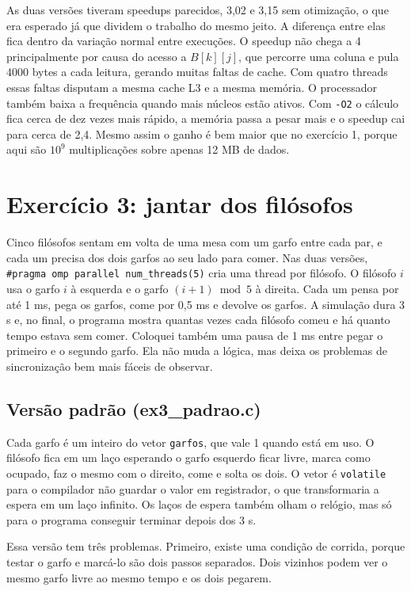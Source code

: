 \documentclass[11pt,a4paper]{article}
\begin{document}
As duas versões tiveram speedups parecidos, 3,02 e 3,15 sem otimização, o que era esperado já que dividem o trabalho do mesmo jeito. A diferença entre elas fica dentro da variação normal entre execuções. O speedup não chega a 4 principalmente por causa do acesso a $B[k][j]$, que percorre uma coluna e pula 4000 bytes a cada leitura, gerando muitas faltas de cache. Com quatro threads essas faltas disputam a mesma cache L3 e a mesma memória. O processador também baixa a frequência quando mais núcleos estão ativos. Com \texttt{-O2} o cálculo fica cerca de dez vezes mais rápido, a memória passa a pesar mais e o speedup cai para cerca de 2,4. Mesmo assim o ganho é bem maior que no exercício 1, porque aqui são $10^9$ multiplicações sobre apenas 12 MB de dados.

\section{Exercício 3: jantar dos filósofos}

Cinco filósofos sentam em volta de uma mesa com um garfo entre cada par, e cada um precisa dos dois garfos ao seu lado para comer. Nas duas versões, \texttt{\#pragma omp parallel num\_threads(5)} cria uma thread por filósofo. O filósofo $i$ usa o garfo $i$ à esquerda e o garfo $(i+1) \bmod 5$ à direita. Cada um pensa por até 1 ms, pega os garfos, come por 0,5 ms e devolve os garfos. A simulação dura 3 s e, no final, o programa mostra quantas vezes cada filósofo comeu e há quanto tempo estava sem comer. Coloquei também uma pausa de 1 ms entre pegar o primeiro e o segundo garfo. Ela não muda a lógica, mas deixa os problemas de sincronização bem mais fáceis de observar.

\subsection{Versão padrão (ex3\_padrao.c)}

Cada garfo é um inteiro do vetor \texttt{garfos}, que vale 1 quando está em uso. O filósofo fica em um laço esperando o garfo esquerdo ficar livre, marca como ocupado, faz o mesmo com o direito, come e solta os dois. O vetor é \texttt{volatile} para o compilador não guardar o valor em registrador, o que transformaria a espera em um laço infinito. Os laços de espera também olham o relógio, mas só para o programa conseguir terminar depois dos 3 s.

Essa versão tem três problemas. Primeiro, existe uma condição de corrida, porque testar o garfo e marcá-lo são dois passos separados. Dois vizinhos podem ver o mesmo garfo livre ao mesmo tempo e os dois pegarem.
\end{document}
